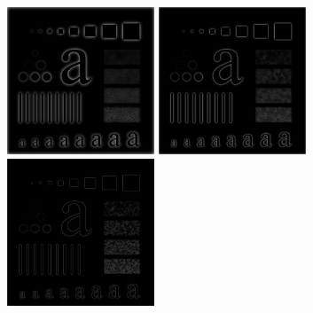 \documentclass{article}
\begin{document}
\includegraphics[width=0.33\textwidth]{../data/gaussian_highpass_30_characters_test_pattern.jpg}
\includegraphics[width=0.33\textwidth]{../data/gaussian_highpass_60_characters_test_pattern.jpg}
\includegraphics[width=0.33\textwidth]{../data/gaussian_highpass_160_characters_test_pattern.jpg}
\end{document}
